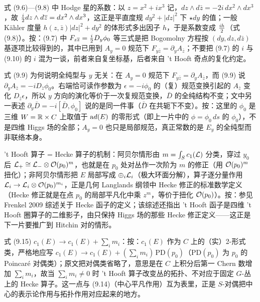 \begin{yizhu}[易错点]
式 (9.6)—(9.8) 中 Hodge 星的系数：以 $z=x^2+ix^3$ 记，$dz\wedge d\bar z=-2i\,dx^2\wedge dx^3$，故 ${i\over2}dz\wedge d\bar z=dx^2\wedge dx^3$，这正是平直度规 $dy^2+|dz|^2$ 下 $\star dy$ 的值；一般 Kähler 度量 $h(z,\bar z)|dz|^2+dy^2$ 的体形式多出因子 $h$，于是系数变成 ${ih\over2}$（式 (9.8)）。按：(9.7) 中 $F_{z\bar z}={i\over2}D_y\phi_0$ 等三式是把 Bogomolny 方程按 $(dy,dz,d\bar z)$ 基逐项比较得到的，其中已用到 $A_y=0$ 规范下 $F_{y\bar z}=\partial_yA_{\bar z}$；不要把 (9.7) 的 $i$ 与 (9.10) 的 $i$ 混为一谈，前者来自复坐标基，后者来自 't Hooft 奇点的复化约定。
\end{yizhu}

\begin{yizhu}[易错点]
式 (9.9) 为何说明全纯型与 $y$ 无关：在 $A_y=0$ 规范下 $F_{y\bar z}=\partial_yA_{\bar z}$，而 (9.9) 说 $\partial_yA_{\bar z}=-iD_{\bar z}\phi_0$。右端恰可读作参数为 $\epsilon=-i\phi_0$ 的（复）规范变换引起的 $A_{\bar z}$ 变化 $D_{\bar z}\epsilon$，所以 $y$ 方向的演化等价于一次复规范变换，$\bar D$ 的全纯结构不变；文中另一表述 $\partial_y\bar D=-i[\bar D,\phi_0]$ 说的是同一件事（$\bar D$ 在共轭下不变）。按：这里的 $\phi_0$ 是三维 $W=\Bbb{R}\times C$ 上取值于 ${\rm ad}(E)$ 的零形式（即上一片中的 $\phi=\phi_0\,ds$ 的 $\phi_0$），不是四维 Higgs 场的全部；$A_y=0$ 也只是局部规范，真正常数的是 $E_y$ 的全纯型而非联络本身。
\end{yizhu}

\begin{yizhu}[物理图像]
't Hooft 算子 = Hecke 算子的机制：阿贝尔情形由 $m=\int_S c_1({\cal L})$ 分类，穿过 $y_0$ 后 ${\cal L}_+\cong{\cal L}_-\otimes{\cal O}(p_0)^m$，也就是在 $p_0$ 处对丛作一次阶为 $m$ 的修正（用 ${\cal O}(p_0)^m$ 扭化）；非阿贝尔情形把 $E$ 局部写成 $\oplus_i{\cal L}_i$（极大环面分解），算子逐分量作用 ${\cal L}_i\to{\cal L}_i\otimes{\cal O}(p_0)^{m_i}$，正是几何 Langlands 纲领中 Hecke 修正的标准数学定义（Hecke 修正就是在点 $p_0$ 的局部平凡化中乘 $z^{m}$，等价于扭化 ${\cal O}(p_0)$）。按：参见 Frenkel 2009 综述关于 Hecke 函子的定义；该综述还指出 't Hooft 函子是四维 't Hooft 圈算子的二维影子，由只保持 Higgs 场的那些 Hecke 修正定义——这正是下一片要推广到 Hitchin 对的情形。
\end{yizhu}

\begin{yizhu}[含糊点拨]
式 (9.15) $c_1(E)\to c_1(E)+\sum_im_i$：按：$c_1(E)$ 作为 $C$ 上的（实）2-形式类，严格地应写 $c_1(E)\to c_1(E)+(\sum_im_i)\,\mathrm{PD}(p_0)$（$\mathrm{PD}(p_0)$ 为 $p_0$ 的 Poincaré 对偶类）；原文把对偶类省略了，意思是在 $C$ 上积分后第一 Chern 数增加 $\sum_im_i$，故当 $\sum_im_i\neq0$ 时 't Hooft 算子改变丛的拓扑、不对应于固定 $G$-丛上的 Hecke 算子。这一点与 (9.14)（中心平凡作用）互为表里，正是 $S$-对偶把中心的表示论作用与拓扑作用对应起来的地方。
\end{yizhu}

